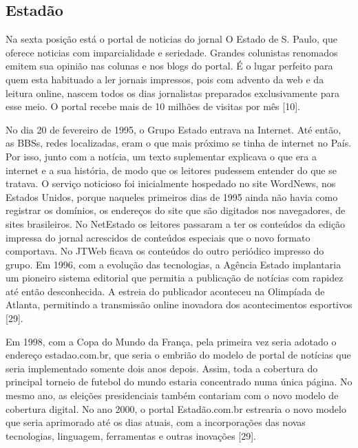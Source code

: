 \documentclass[a4paper]{article}
\begin{document}
\begin{titlepage}
\subsection{Estadão}

Na sexta posição está o portal de noticias do jornal O Estado de S. Paulo, que oferece noticias com imparcialidade e seriedade. Grandes colunistas renomados emitem sua opinião nas colunas e nos blogs do portal. É o lugar perfeito para quem esta habituado a ler jornais impressos, pois com advento da web e da leitura online, nascem todos os dias jornalistas preparados exclusivamente para esse meio. O portal recebe mais de 10 milhões de visitas por mês [10].

No dia 20 de fevereiro de 1995, o Grupo Estado entrava na Internet. Até então, as BBSs, redes localizadas, eram o que mais próximo se tinha de internet no País. Por isso, junto com a notícia, um texto suplementar explicava o que era a internet e a sua história, de modo que os leitores pudessem entender do que se tratava. O serviço noticioso foi inicialmente hospedado no site WordNews, nos Estados Unidos, porque naqueles primeiros dias de 1995 ainda não havia como registrar os domínios, os endereços do site que são digitados nos navegadores, de sites brasileiros. No NetEstado os leitores passaram a ter os conteúdos da edição impressa do jornal acrescidos de conteúdos especiais que o novo formato comportava. No JTWeb ficava os conteúdos do outro periódico impresso do grupo. Em 1996, com a evolução das tecnologias, a Agência Estado implantaria um pioneiro sistema editorial que permitia a publicação de notícias com rapidez até então desconhecida. A estreia do publicador aconteceu na Olimpíada de Atlanta, permitindo a transmissão online inovadora dos acontecimentos esportivos [29].

Em 1998, com a Copa do Mundo da França, pela primeira vez seria adotado o endereço estadao.com.br, que seria o embrião do modelo de portal de notícias que seria implementado somente dois anos depois. Assim, toda a cobertura do principal torneio de futebol do mundo estaria concentrado numa única página. No mesmo ano, as eleições presidenciais também contariam com o novo modelo de cobertura digital. No ano 2000, o portal Estadão.com.br estrearia o novo modelo que seria aprimorado até os dias atuais, com a incorporações das novas tecnologias, linguagem, ferramentas e outras inovações [29].


\end{titlepage}
\end{document}
